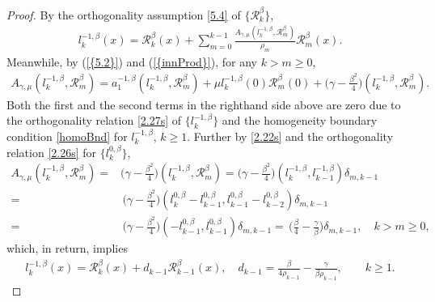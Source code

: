 \documentclass[10pt,reqno]{amsart}
\theoremstyle{remark}
\theoremstyle{definition}
\begin{document}
\begin{proof}  By the orthogonality assumption \eqref{5.4} of $\{\mathcal{R}_{k}^{\beta}\}$,
\begin{align*}
l_k^{-1,\beta}(x)=\mathcal{R}_{k}^{\beta}(x) + {\displaystyle\sum}_{m=0}^{k-1}\frac{A_{\gamma,\mu}(l_k^{-1,\beta},  \mathcal{R}_{m}^{\beta})}{\rho_{m}} \mathcal{R}_{m}^{\beta}(x).
\end{align*}
Meanwhile, by {{\rm (\ref{{5.2}})}} and {{\rm (\ref{{innProd}})}}, for any $k>m\ge 0$,
\begin{align*}
A_{\gamma,\mu}(l_k^{-1,\beta},  \mathcal{R}_{m}^{\beta})
= a^{-1,\beta}_1(l_k^{-1,\beta},  \mathcal{R}_{m}^{\beta}) + \mu l_k^{-1,\beta}(0) \mathcal{R}_{m}^{\beta}(0)+ \big(\gamma-\frac{\beta^2}{4}\big) (l_k^{-1,\beta},  \mathcal{R}_{m}^{\beta}) .
\end{align*}
Both the first  and  the second terms in the righthand side above  are zero due to the orthogonality relation \eqref{2.27s}
 of  $\{l_k^{-1,\beta}\}$
and the homogeneity boundary condition \eqref{homoBnd} for  $l_k^{-1,\beta},\, k\ge 1$. Further by \eqref{2.22s} and the orthogonality
relation \eqref{2.26s} for  $\{l^{0,\beta}_k\}$,
\begin{align*}
A_{\gamma,\mu}(l_k^{-1,\beta},  \mathcal{R}_{m}^{\beta}) =&  \big(\gamma-\frac{\beta^2}{4}\big) (l_k^{-1,\beta},  \mathcal{R}_{m}^{\beta})=  \big(\gamma-\frac{\beta^2}{4}\big) (l_k^{-1,\beta},  l_{k-1}^{-1,\beta})\delta_{m,k-1}
\\= &\, \big(\gamma-\frac{\beta^2}{4}\big) (l_k^{0,\beta}-l_{k-1}^{0,\beta}, l_{k-1}^{0,\beta}-l_{k-2}^{0,\beta})\delta_{m,k-1}
\\=&\,
   \big(\gamma-\frac{\beta^2}{4}\big)   (-l_{k-1}^{0,\beta},  l_{k-1}^{0,\beta})\delta_{m,k-1}
    =\,\big(\frac{\beta}{4}-\frac{\gamma}{\beta}\big)   \delta_{m,k-1},  \quad k>m\ge 0,
\end{align*}
which, in return,  implies
\begin{align*}
l_k^{-1,\beta}(x)= \mathcal{R}_{k}^{\beta}(x) +  d_{k-1} \mathcal{R}_{k-1}^{\beta}(x),\quad
d_{k-1}  =   \frac{\beta}{4\rho_{k-1}}-\frac{\gamma}{\beta \rho_{k-1}},
\qquad k\ge 1.
\end{align*}


\end{proof}
\end{document}

